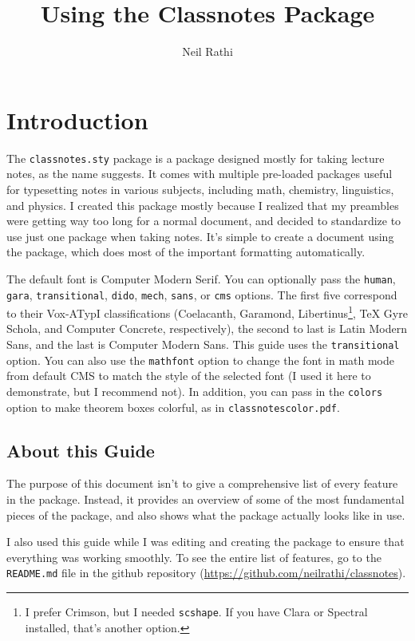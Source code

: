 \documentclass[11pt]{article}
\title{Using the Classnotes Package}
\author{Neil Rathi}
\begin{document}
\thispagestyle{empty}

\maketitle

\tableofcontents

\newpage

\section{Introduction}
The \texttt{classnotes.sty} package is a package designed mostly for taking lecture notes, as the name suggests. It comes with multiple pre-loaded packages useful for typesetting notes in various subjects, including math, chemistry, linguistics, and physics. I created this package mostly because I realized that my preambles were getting way too long for a normal document, and decided to standardize to use just one package when taking notes. It's simple to create a document using the package, which does most of the important formatting automatically.

The default font is Computer Modern Serif. You can optionally pass the \texttt{human}, \texttt{gara}, \texttt{transitional}, \texttt{dido}, \texttt{mech}, \texttt{sans}, or \texttt{cms} options. The first five correspond to their Vox-ATypI classifications (Coelacanth, Garamond, Libertinus\footnote{I prefer Crimson, but I needed \texttt{scshape}. If you have Clara or Spectral installed, that's another option.}, \TeX{} Gyre Schola, and Computer Concrete, respectively), the second to last is Latin Modern Sans, and the last is Computer Modern Sans. This guide uses the \verb|transitional| option. You can also use the \verb|mathfont| option to change the font in math mode from default CMS to match the style of the selected font (I used it here to demonstrate, but I recommend not). In addition, you can pass in the \texttt{colors} option to make theorem boxes colorful, as in \texttt{classnotescolor.pdf}.

\subsection{About this Guide}
The purpose of this document isn't to give a comprehensive list of every feature in the package. Instead, it provides an overview of some of the most fundamental pieces of the package, and also shows what the package actually looks like in use.

I also used this guide while I was editing and creating the package to ensure that everything was working smoothly. To see the entire list of features, go to the \texttt{README.md} file in the github repository (\url{https://github.com/neilrathi/classnotes}).
\end{document}
